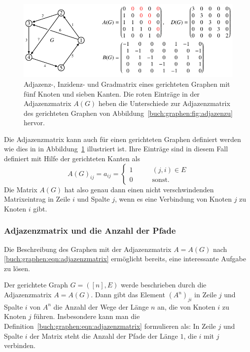 \begin{figure}
\centering
\includegraphics{chapters/70-graphen/images/adjazenzd.pdf}
\caption{Adjazenz-, Inzidenz- und Gradmatrix eines gerichteten
Graphen mit fünf Knoten und sieben Kanten.
Die roten Einträge in der Adjazenzmatrix $A(G)$ heben die
Unterschiede zur Adjazenzmatrix des gerichteten Graphen
von Abbildung~\ref{buch:graphen:fig:adjazenzu} hervor.
\label{buch:graphen:fig:adjazenzd}}
\end{figure}
Die Adjazenzmatrix kann auch für einen gerichteten Graphen definiert
werden wie dies in in Abbildung~\ref{buch:graphen:fig:adjazenzd}
illustriert ist.
Ihre Einträge sind in diesem Fall definiert mit Hilfe der 
gerichteten Kanten als
\begin{equation}
A(G)_{i\!j}
=
a_{i\!j}
=
\begin{cases}
1&\qquad  (j,i) \in E\\
0&\qquad  \text{sonst.}
\end{cases}
\label{buch:graphen:eqn:adjazenzmatrixgerichtet}
\end{equation}
Die Matrix $A(G)$ hat also genau dann einen nicht verschwindenden
Matrixeintrag in Zeile $i$ und Spalte $j$, wenn es eine Verbindung
von Knoten $j$ zu Knoten $i$ gibt.

\subsubsection{Adjazenzmatrix und die Anzahl der Pfade}
Die Beschreibung des Graphen mit der Adjazenzmatrix $A=A(G)$ nach
\eqref{buch:graphen:eqn:adjazenzmatrix} ermöglicht bereits, eine
interessante Aufgabe zu lösen.

\begin{satz}
\label{buch:graphen:pfade-der-laenge-n}
Der gerichtete Graph $G=([n],E)$ werde beschrieben durch die Adjazenzmatrix
$A=A(G)$.
Dann gibt das Element $(A^n)_{ji}$ in Zeile $j$ und Spalte $i$ von $A^n$
die Anzahl der Wege der Länge $n$ an, die von Knoten $i$ zu Knoten $j$ führen.
Insbesondere kann man die Definition~\eqref{buch:graphen:eqn:adjazenzmatrix}
formulieren als: In Zeile $j$ und Spalte $i$ der Matrix steht die Anzahl
der Pfade der Länge $1$, die $i$ mit $j$ verbinden.
\end{satz}
%

